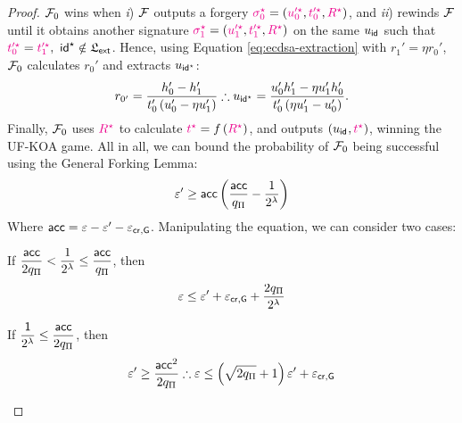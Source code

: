 \documentclass[version=submission, floatrow]{iacrcc}
\begin{document}
\begin{proof}
    $\mathcal{F}_{0}$ wins when \emph{i}) $\mathcal{F}$ outputs a forgery $\textcolor{magenta}{\sigma_{0}^{\star}} = \left(\textcolor{magenta}{u_{0}'^{\star}}, \textcolor{magenta}{t_{0}'^{\star}}, \textcolor{magenta}{R^{\star}}\right)$, and \emph{ii}) rewinds $\mathcal{F}$ until it obtains another signature $\textcolor{magenta}{\sigma_{1}^{\star}} = \left(\textcolor{magenta}{u_{1}'^{\star}}, \textcolor{magenta}{t_{1}'^{\star}}, \textcolor{magenta}{R^{\star}}\right)$ on the same $u_{\mathsf{id}_{}}$ such that $\textcolor{magenta}{t_{0}'^{\star}} = \textcolor{magenta}{t_{1}'^{\star}},\ \mathsf{id}_{}^{\star} \notin \mathfrak{L}_{\mathsf{ext}}$.
    Hence, using Equation \ref{eq:ecdsa-extraction} with $r_{1}' = \eta r_{0}'$, $\mathcal{F}_{0}$ calculates $r_{0}'$ and extracts $u_{\mathsf{id}_{}^{\star}}$:\begin{equation}
        r_{0'} = \dfrac{h_{0}' - h_{1}'}{t_{0}'\left(u_{0}' - \eta u_{1}'\right)} \therefore u_{\mathsf{id}_{}^{\star}} = \dfrac{u_{0}'h_{1}' - \eta u_{1}'h_{0}'}{t_{0}'\left(\eta u_{1}' - u_{0}'\right)}.
    \end{equation}
    Finally, $\mathcal{F}_{0}$ uses $\textcolor{magenta}{R^{\star}}$ to calculate $\textcolor{magenta}{t^{\star}} = f\left(\textcolor{magenta}{R^{\star}}\right)$, and outputs $\left(u_{\mathsf{id}_{}}, \textcolor{magenta}{t^{\star}}\right)$, winning the UF-KOA game.
    All in all, we can bound the probability of $\mathcal{F}_{0}$ being successful using the General Forking Lemma:\begin{equation*}
        \varepsilon' \ge \mathsf{acc}\left(\dfrac{\mathsf{acc}}{q_{\Pi}} - \dfrac{1}{2^{\lambda}}\right)
    \end{equation*}
    Where $\mathsf{acc} = \varepsilon - \varepsilon' - \varepsilon_{\mathsf{cr}, \mathsf{G}}$.
    Manipulating the equation, we can consider two cases:
    \begin{case}
        If $\dfrac{\mathsf{acc}}{2q_{\Pi}} < \dfrac{1}{2^{\lambda}} \le \dfrac{\mathsf{acc}}{q_{\Pi}}$, then\begin{equation}
            \varepsilon \le \varepsilon' + \varepsilon_{\mathsf{cr}, \mathsf{G}} + \dfrac{2q_{\Pi}}{2^{\lambda}}
        \end{equation}
    \end{case}
    \begin{case}
        If $\dfrac{\mathsf{1}}{2^{\lambda}} \le \dfrac{\mathsf{acc}}{2q_{\Pi}}$, then\begin{equation}
            \varepsilon' \ge \dfrac{\mathsf{acc}^{2}}{2q_{\Pi}} \therefore \varepsilon \le \left(\sqrt{2q_{\Pi}} + 1\right)\varepsilon' + \varepsilon_{\mathsf{cr}, \mathsf{G}}
        \end{equation}
    \end{case}
\end{proof}
\end{document}
